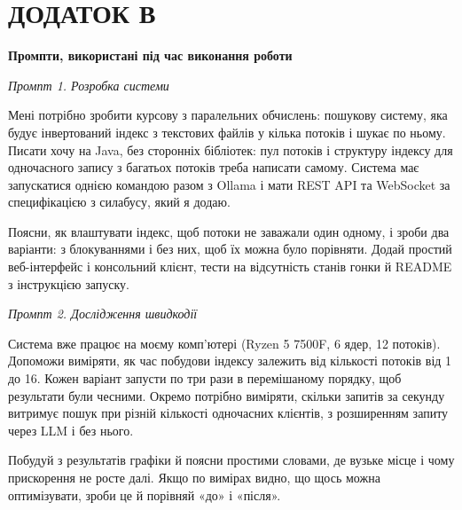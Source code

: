 \clearpage
\section*{ДОДАТОК В}
\begin{center}\bfseries Промпти, використані під час виконання роботи\end{center}

\textit{Промпт 1. Розробка системи}

Мені потрібно зробити курсову з паралельних обчислень: пошукову систему, яка будує
інвертований індекс з текстових файлів у кілька потоків і шукає по ньому. Писати хочу на
Java, без сторонніх бібліотек: пул потоків і структуру індексу для одночасного запису з
багатьох потоків треба написати самому. Система має запускатися однією командою
 разом з Ollama і мати REST API та WebSocket за специфікацією з
силабусу, який я додаю.

Поясни, як влаштувати індекс, щоб потоки не заважали один одному, і зроби два варіанти: з
блокуваннями і без них, щоб їх можна було порівняти. Додай простий веб-інтерфейс і консольний
клієнт, тести на відсутність станів гонки й README з інструкцією запуску.

\bigskip
\textit{Промпт 2. Дослідження швидкодії}

Система вже працює на моєму комп'ютері (Ryzen 5 7500F, 6 ядер, 12 потоків). Допоможи
виміряти, як час побудови індексу залежить від кількості потоків від 1 до 16. Кожен варіант
запусти по три рази в перемішаному порядку, щоб результати були чесними. Окремо потрібно
виміряти, скільки запитів за секунду витримує пошук при різній кількості одночасних клієнтів, з
розширенням запиту через LLM і без нього.

Побудуй з результатів графіки й поясни простими словами, де вузьке місце і чому прискорення не
росте далі. Якщо по вимірах видно, що щось можна оптимізувати, зроби це й порівняй «до» і
«після».
